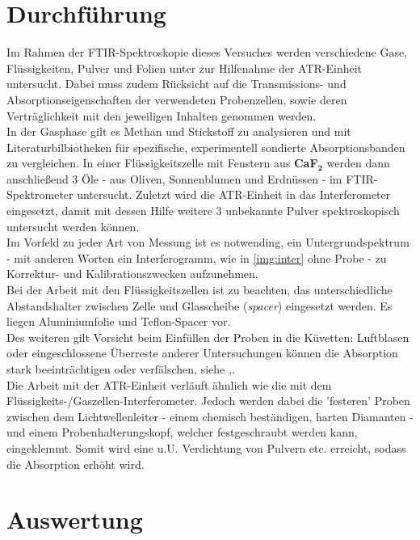 \documentclass[a4paper,10pt,twocolumn]{article}
\newcommand{\tilt}[1]{\textit{#1}}
\newcommand{\fett}[1]{\textbf{#1}}
\begin{document}
	\section{Durchführung}

		Im Rahmen der FTIR-Spektroskopie dieses Versuches werden verschiedene Gase, Fl\"ussigkeiten, Pulver und Folien unter zur Hilfenahme der ATR-Einheit untersucht. Dabei muss zudem R\"ucksicht auf die Transmissions- und Absorptionseigenschaften der verwendeten Probenzellen, sowie deren Vertr\"aglichkeit mit den jeweiligen Inhalten genommen werden.\\
		In der Gasphase gilt es Methan und Stickstoff zu analysieren und mit Literaturbilbiotheken f\"ur spezifische, experimentell sondierte Absorptionsbanden zu vergleichen. In einer Fl\"ussigkeitszelle mit Fenstern aus \fett{CaF}$_{\fett{2}}$ werden dann anschlie{\ss}end 3 \"Ole - aus Oliven, Sonnenblumen und Erdn\"ussen - im FTIR-Spektrometer untersucht. Zuletzt wird die ATR-Einheit in das Interferometer eingesetzt, damit mit dessen Hilfe weitere 3 unbekannte Pulver spektroskopisch untersucht werden k\"onnen.\\
		Im Vorfeld zu jeder Art von Messung ist es notwending, ein Untergrundspektrum - mit anderen Worten ein Interferogramm, wie in \autoref{img:inter} ohne Probe - zu Korrektur- und Kalibrationszwecken aufzunehmen.\\
		Bei der Arbeit mit den Fl\"ussigkeitszellen ist zu beachten, das unterschiedliche Abstandshalter zwischen Zelle und Glasscheibe (\tilt{spacer}) eingesetzt werden. Es liegen Aluminiumfolie und Teflon-Spacer vor.\\
		Des weiteren gilt Vorsicht beim Einf\"ullen der Proben in die K\"uvetten: Luftblasen oder eingeschlossene \"Uberreste anderer Untersuchungen k\"onnen die Absorption stark beeintr\"achtigen oder verf\"alschen, siehe \cite{FTIRAns},\cite{EMAUGreifswaldFTIR}.\\
		Die Arbeit mit der ATR-Einheit verl\"auft \"ahnlich wie die mit dem Fl\"ussigkeits-/Gaszellen-Interferometer. Jedoch werden dabei die 'festeren' Proben zwischen dem Lichtwellenleiter - einem chemisch best\"andigen, harten Diamanten - und einem Probenhalterungskopf, welcher festgeschraubt werden kann, eingeklemmt. Somit wird eine u.U. Verdichtung von Pulvern etc. erreicht, sodass die Absorption erh\"oht wird.

	\section{Auswertung}
\end{document}

